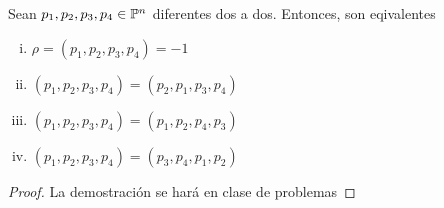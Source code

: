 \begin{prop}\label{prop:intercambio_raz_do}
 Sean $p_1,p_2,p_3,p_4 \in \mathbb{P}^n$ diferentes dos a dos. Entonces, son eqivalentes
 \begin{enumerate}[i)]
  \item $\rho = (p_1,p_2,p_3,p_4) = -1$
  \item $(p_1,p_2,p_3,p_4) = (p_2,p_1,p_3,p_4)$
  \item $(p_1,p_2,p_3,p_4) = (p_1,p_2,p_4,p_3)$
  \item $(p_1,p_2,p_3,p_4) = (p_3,p_4,p_1,p_2)$
 \end{enumerate}
\end{prop}

\begin{proof}
 La demostración se hará en clase de problemas
\end{proof}

